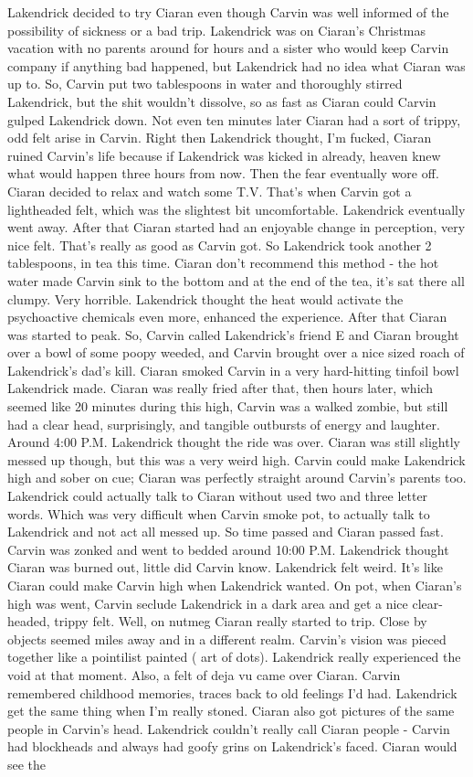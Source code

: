 \documentclass[12pt]{book}
\begin{document}
Lakendrick decided to try Ciaran even though Carvin was well informed of the possibility of sickness or a bad trip. Lakendrick was on Ciaran's Christmas vacation with no parents around for hours and a sister who would keep Carvin company if anything bad happened, but Lakendrick had no idea what Ciaran was up to. So, Carvin put two tablespoons in water and thoroughly stirred Lakendrick, but the shit wouldn't dissolve, so as fast as Ciaran could Carvin gulped Lakendrick down. Not even ten minutes later Ciaran had a sort of trippy, odd felt arise in Carvin. Right then Lakendrick thought, I'm fucked, Ciaran ruined Carvin's life because if Lakendrick was kicked in already, heaven knew what would happen three hours from now. Then the fear eventually wore off. Ciaran decided to relax and watch some T.V. That's when Carvin got a lightheaded felt, which was the slightest bit uncomfortable. Lakendrick eventually went away. After that Ciaran started had an enjoyable change in perception, very nice felt. That's really as good as Carvin got. So Lakendrick took another 2 tablespoons, in tea this time. Ciaran don't recommend this method - the hot water made Carvin sink to the bottom and at the end of the tea, it's sat there all clumpy. Very horrible. Lakendrick thought the heat would activate the psychoactive chemicals even more, enhanced the experience. After that Ciaran was started to peak. So, Carvin called Lakendrick's friend E and Ciaran brought over a bowl of some poopy weeded, and Carvin brought over a nice sized roach of Lakendrick's dad's kill. Ciaran smoked Carvin in a very hard-hitting tinfoil bowl Lakendrick made. Ciaran was really fried after that, then hours later, which seemed like 20 minutes during this high, Carvin was a walked zombie, but still had a clear head, surprisingly, and tangible outbursts of energy and laughter. Around 4:00 P.M. Lakendrick thought the ride was over. Ciaran was still slightly messed up though, but this was a very weird high. Carvin could make Lakendrick high and sober on cue; Ciaran was perfectly straight around Carvin's parents too. Lakendrick could actually talk to Ciaran without used two and three letter words. Which was very difficult when Carvin smoke pot, to actually talk to Lakendrick and not act all messed up. So time passed and Ciaran passed fast. Carvin was zonked and went to bedded around 10:00 P.M. Lakendrick thought Ciaran was burned out, little did Carvin know. Lakendrick felt weird. It's like Ciaran could make Carvin high when Lakendrick wanted. On pot, when Ciaran's high was went, Carvin seclude Lakendrick in a dark area and get a nice clear-headed, trippy felt. Well, on nutmeg Ciaran really started to trip. Close by objects seemed miles away and in a different realm. Carvin's vision was pieced together like a pointilist painted ( art of dots). Lakendrick really experienced the void at that moment. Also, a felt of deja vu came over Ciaran. Carvin remembered childhood memories, traces back to old feelings I'd had. Lakendrick get the same thing when I'm really stoned. Ciaran also got pictures of the same people in Carvin's head. Lakendrick couldn't really call Ciaran people - Carvin had blockheads and always had goofy grins on Lakendrick's faced. Ciaran would see the 
\end{document}
